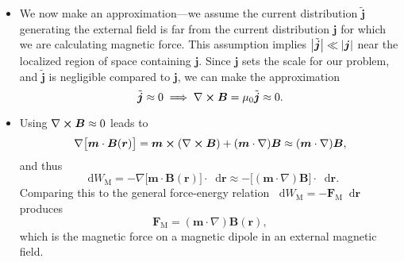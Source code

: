 \documentclass[11pt, a4paper]{article}
\newcommand{\diff}{\mathop{}\!\mathrm{d}} %
\renewcommand{\vec}[1]{\bm{#1}} %
\renewcommand{\t}[1]{\tilde{#1}} %
\renewcommand{\r}{\vec{r}}
\newcommand{\B}{\vec{B}} %
\newcommand{\mm}{\mu_{0}}  %
\newcommand{\m}{\vec{m}}  %
\renewcommand{\j}{\vec{j}}  %
\renewcommand{\curl}{\nabla \cross}
\renewcommand{\grad}{\nabla}
\begin{document}
\begin{itemize}
	\item We now make an approximation---we assume the current distribution $ \t{\j} $ generating the external field is far from the current distribution $ \j $ for which we are calculating magnetic force. This assumption implies $ \big |\t{\j}\big | \ll \abs{\j} $ near the localized region of space containing $ \j $. Since $ \j $ sets the scale for our problem, and $ \t{\j} $ is negligible compared to $ \j $, we can make the approximation
	\begin{equation*}
		\tilde{\j} \approx 0 \implies \curl \B = \mm \t{\j} \approx 0.
	\end{equation*}

	\item Using $ \curl \B \approx 0 $ leads to
	\begin{equation*}
		\grad\big[\m \cdot \B(\r)\big] = \m \cross (\curl \B) + (\m \cdot \grad)\B \approx (\m \cdot \grad)\B,
	\end{equation*}
	and thus
	\begin{equation*}
		\diff W_{\text{M}} = - \grad\big[\m \cdot \B(\r)\big]\cdot  \diff \r \approx - \big[ (\m \cdot \grad)\B\big]\cdot \diff \r.
	\end{equation*}
	Comparing this to the general force-energy relation $ \diff W_{\text{M}} = - \vec{F}_{\text{M}}\diff \r $ produces
	\begin{equation*}
		\vec{F}_{\text{M}} = (\m \cdot \grad)\B(\r),
	\end{equation*}
    which is the magnetic force on a magnetic dipole in an external magnetic field.
    
\end{itemize}
\end{document}
